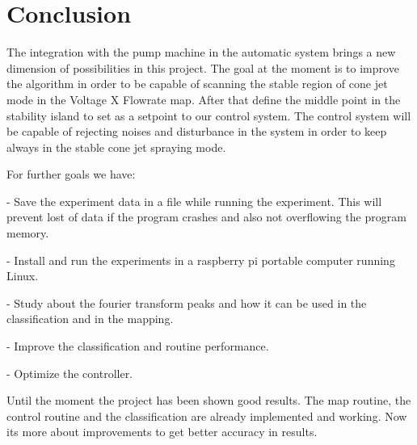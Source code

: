 \section{Conclusion}

The integration with the pump machine in the automatic system brings a new dimension of possibilities in this project.
The goal at the moment is to improve the algorithm in order to be capable of scanning the stable region of cone jet mode in the Voltage X Flowrate map.
After that define the middle point in the stability island to set as a setpoint to our control system.
The control system will be capable of rejecting noises and disturbance in the system in order to keep always in the stable cone jet spraying mode.

For further goals we have:

 - Save the experiment data in a file while running the experiment. This will prevent lost of data if the program crashes and also not overflowing the program memory.
 
 - Install and run the experiments in a raspberry pi portable computer running Linux.
 
 - Study about the fourier transform peaks and how it can be used in the classification and in the mapping.
 
 - Improve the classification and routine performance.
 
 - Optimize the controller.

Until the moment the project has been shown good results.
The map routine, the control routine and the classification are already implemented and working.
Now its more about improvements to get better accuracy in results.
